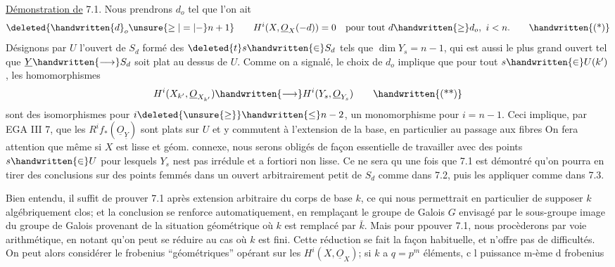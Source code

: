 \uline{Démonstration de} 7.1. Nous prendrons  $d_o$   tel que l'on ait 
\[
\deleted{\handwritten{d}_o\unsure{\geq|=|-}n+1}\qquad H^i(X,\underline{O}_X(-d))=0\quad\text{pour tout }d\handwritten{\geq}d_o,\ i<n.
\tag*{\handwritten{(*)}}
\]
Désignons par $U$ l'ouvert de $S_d$ formé des $\deleted{t}s\handwritten{\in}S_d$ tels que $\dim Y_s=n-1$, qui est aussi le plus grand ouvert tel que $\underline{Y}\handwritten{\longrightarrow}S_d$ soit plat au dessus de $U$. Comme on a signalé, le choix de $d_o$ implique que pour tout $s\handwritten{\in}U(k')$, les homomorphismes
\[
H^i(X_{k'},\underline{O}_{X_{k'}})\handwritten{\longrightarrow}H^i(Y_s,\underline{O}_{Y_s})
\tag*{\handwritten{(**)}}
\]
sont des isomorphismes pour $i\deleted{\unsure{\geq}}\handwritten{\leq}n-2$, un monomorphisme pour $i=n-1$. Ceci implique, par EGA III 7, que les $R^if_*(\underline{O}_{\underline{Y}})$ sont plats sur $U$ et y commutent à l'extension de la base, en particulier au passage aux fibres On fera attention que même si $X$ est lisse et géom. connexe, nous serons obligés de façon essentielle de travailler avec des points $s\handwritten{\in}U$ pour lesquels $Y_s$ nest pas irrédule et a fortiori non lisse. Ce ne sera qu une fois que 7.1 est démontré qu'on pourra en tirer des conclusions  sur des points femmés dans un ouvert arbitrairement petit de $S_d$ comme dans 7.2, puis les appliquer comme dans 7.3.

Bien entendu, il suffit de prouver 7.1 après extension arbitraire du corps de base $k$, ce qui nous permettrait en particulier de supposer $k$ algébriquement clos; et la conclusion se renforce  automatiquement, en remplaçant le groupe de Galois $G$ envisagé par le sous-groupe image du groupe de Galois provenant de la situation géométrique où $k$ est remplacé par $\bar{k}$. Mais pour ppouver 7.1, nous procèderons  par voie arithmétique, en notant qu'on peut se réduire au cas où $k$ est fini. Cette réduction se fait  la façon habituelle, et n'offre pas de difficultés.  On peut alors considérer le frobenius ``géométriques'' opérant sur les $H^i(X,\underline{O}_X)$; si $k$ a $q=p^m$ éléments, c  l puissance m-ème d frobenius

